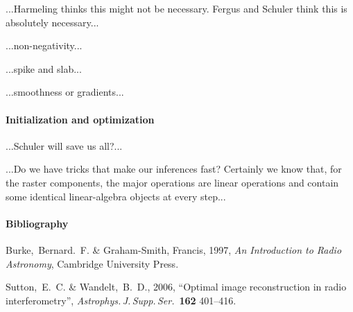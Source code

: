 \documentclass[12pt]{article}
\begin{document}
...Harmeling thinks this might not be necessary.  Fergus and Schuler
think this is absolutely necessary...

...non-negativity...

...spike and slab...

...smoothness or gradients...

\paragraph{Initialization and optimization}

...Schuler will save us all?...

...Do we have tricks that make our inferences fast?  Certainly we know
that, for the raster components, the major operations are linear
operations and contain some identical linear-algebra objects at every
step...

\paragraph{Bibliography}
\begin{trivlist}\raggedright
\item Burke,~Bernard.~F. \& Graham-Smith, Francis, 1997, \textit{An Introduction to Radio Astronomy}, Cambridge University Press.
\item Sutton,~E.~C. \& Wandelt,~B.~D., 2006, ``Optimal image reconstruction in radio interferometry'', \textit{Astrophys.\,J.\,Supp.\,Ser.}\ \textbf{162} 401--416.
\end{trivlist}
\end{document}
